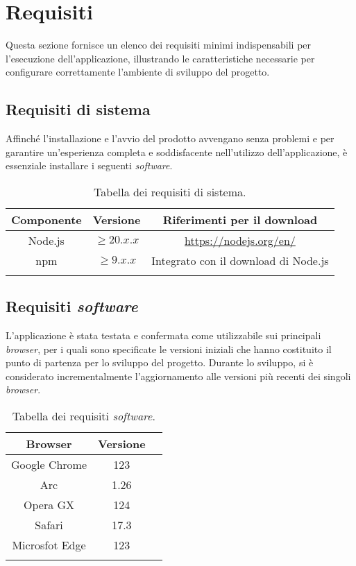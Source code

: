 \section{Requisiti}
Questa sezione fornisce un elenco dei requisiti minimi indispensabili per l'esecuzione dell'applicazione, illustrando le caratteristiche necessarie per configurare 
correttamente l'ambiente di sviluppo del progetto.

\subsection{Requisiti di sistema}
Affinché l'installazione e l'avvio del prodotto avvengano senza problemi e per garantire un'esperienza completa e soddisfacente nell'utilizzo 
dell'applicazione, è essenziale installare i seguenti \textit{software}.

\begin{longtable}{|c|c|c|}
	\hline
	\textbf{Componente}       & \textbf{ Versione}   & \textbf{ Riferimenti per il download} \\
	\hline
     Node.js             & $ \geq  20.x.x$            &\href{https://nodejs.org/en/}{https://nodejs.org/en/}        \\
    \hline
     npm                & $ \geq 9.x.x$            &Integrato con il download di Node.js        \\
    \hline

    \caption{Tabella dei requisiti di sistema.}
\end{longtable}


\subsection{Requisiti \textit{software}}
L'applicazione è stata testata e confermata come utilizzabile sui principali \textit{browser}, per i quali sono specificate le versioni iniziali che hanno costituito 
il punto di partenza per lo sviluppo del progetto. Durante lo sviluppo, si è considerato incrementalmente l'aggiornamento alle versioni più recenti dei singoli \textit{browser}.

\begin{longtable}{|c|c|c|}
	\hline
	\textbf{Browser}       & \textbf{ Versione}    \\
	\hline
    Google Chrome             & 123                    \\
    \hline
    Arc                       & 1.26                    \\
    \hline
    Opera GX                       & 124                    \\
    \hline
    Safari                        & 17.3                    \\
    \hline
    Microsfot Edge                 & 123                      \\
    \hline

    \caption{Tabella dei requisiti \textit{software}.}
\end{longtable}


